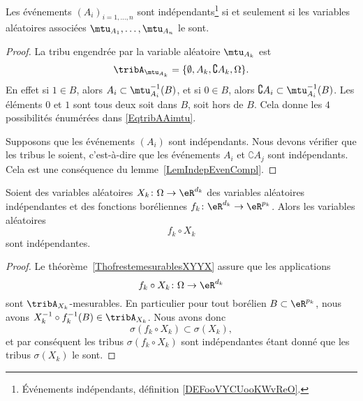 \begin{proposition}
    Les événements \( (A_i)_{i=1,\ldots,n}\) sont indépendants\footnote{Événements indépendants, définition \ref{DEFooVYCUooKWvReO}.} si et seulement si les variables aléatoires associées \( \mtu_{A_1},\ldots,\mtu_{A_n}\) le sont.
\end{proposition}

\begin{proof}
	La tribu engendrée par la variable aléatoire \( \mtu_{A_k}\) est
	\begin{equation}    \label{EqtribAAimtu}
		\tribA_{\mtu_{A_k}}=\{ \emptyset,A_k,\complement A_k,\Omega \}.
	\end{equation}
	En effet si \( 1\in B\), alors \( A_i\subset\mtu_{A_i}^{-1}(B)\), et si \( 0\in B\), alors \( \complement A_i\subset\mtu_{A_i}^{-1}(B)\). Les éléments \( 0\) et \( 1\) sont tous deux soit dans \( B\), soit hors de \( B\). Cela donne les \( 4\) possibilités énumérées dans \eqref{EqtribAAimtu}.

	Supposons que les événements \( (A_i)\) sont indépendants. Nous devons vérifier que les tribus le soient, c'est-à-dire que les événements \( A_i\) et \( \complement A_j\) sont indépendants. Cela est une conséquence du lemme~\ref{LemIndepEvenCompl}.
\end{proof}

\begin{proposition}     \label{PROPooSYNQooAlpGdI}
	Soient des variables aléatoires \( X_k\colon \Omega\to \eR^{d_k}\) des variables aléatoires indépendantes et des fonctions boréliennes \( f_k\colon \eR^{d_k}\to \eR^{p_k}\). Alors les variables aléatoires 
    \begin{equation}
        f_k\circ X_k
    \end{equation}
    sont indépendantes.
\end{proposition}

\begin{proof}
	Le théorème~\ref{ThofrestemesurablesXYYX} assure que les applications
	\begin{equation}
		f_k\circ X_k\colon \Omega\to \eR^{d_k}
	\end{equation}
	sont \( \tribA_{X_k}\)-mesurables. En particulier pour tout borélien \( B\subset\eR^{p_k}\), nous avons \( X^{-1}_k\circ f^{-1}_k(B)\in\tribA_{X_k}\). Nous avons donc
	\begin{equation}
		\sigma(f_k\circ X_k)\subset\sigma(X_k),
	\end{equation}
	et par conséquent les tribus \( \sigma(f_k\circ X_k)\) sont indépendantes étant donné que les tribus \( \sigma(X_k)\) le sont.
\end{proof}

